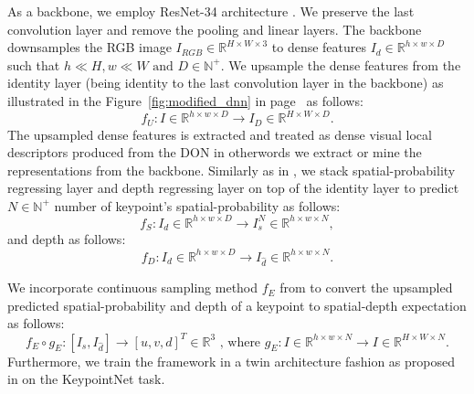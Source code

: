 As a backbone, we employ ResNet-34 architecture \cite{resnet}.
We preserve the last convolution layer and remove the pooling and linear layers.
The backbone downsamples the RGB image $I_{RGB} \in \mathbb{R}^{H \times W \times 3}$
to dense features $I_d \in \mathbb{R}^{h \times w \times D}$
such that $ h \ll H, w \ll W \text{ and } D \in \mathbb{N}^+$.
We upsample the dense features from the identity layer
(being identity to the last convolution layer in the backbone) as illustrated in the Figure~\ref{fig:modified_dnn} in page~\pageref{fig:modified_dnn} as follows:
\begin{equation}
    f_U: I \in \mathbb{R}^{h \times w \times D} \rightarrow I_D \in \mathbb{R}^{H \times W \times D}.
\end{equation}
The upsampled dense features is extracted and treated as dense visual local descriptors produced from the DON in otherwords
we extract or mine the representations from the backbone.
Similarly as in \cite{suwajanakorn2018discovery}, we stack spatial-probability regressing layer and
depth regressing layer on top of the identity layer to predict $N \in \mathbb{N}^+$ number of keypoint's spatial-probability as follows:
\begin{equation}
    f_S: I_d \in \mathbb{R}^{h \times w \times D} \rightarrow I_s^N \in \mathbb{R}^{h \times w \times N},
\end{equation}
and depth as follows:
\begin{equation}
    f_D: I_d \in \mathbb{R}^{h \times w \times D} \rightarrow I_{\hat{d}} \in \mathbb{R}^{h \times w \times N}.
\end{equation}

We incorporate continuous sampling method $f_E$ from \parencites{florence2020dense}{suwajanakorn2018discovery}
to convert the upsampled predicted spatial-probability and depth of a keypoint to spatial-depth expectation as follows:
\begin{equation}
    f_E \circ g_E:[I_s, I_{\hat{d}}] \rightarrow [u, v, d]^T \in \mathbb{R}^3 \text{ , where }  g_E: I \in \mathbb{R}^{h \times w \times N} \rightarrow I \in \mathbb{R}^{H \times W \times N}.
\end{equation}
Furthermore, we train the framework in a twin architecture fashion as proposed in
\parencites{chen2020simple}{zbontar2021barlow}{florence2018dense}{florence2020dense}{kupcsik2021supervised}{adrian2022efficient}{hadjivelichkov2021fully}{nerf-Supervision}
on the KeypointNet task.

